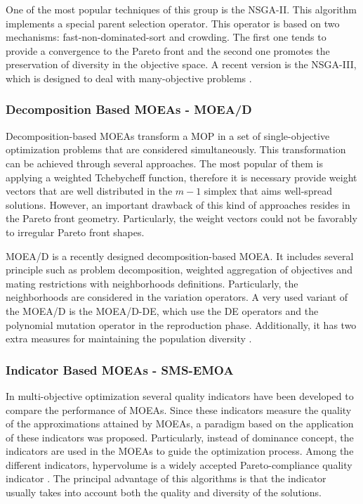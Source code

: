 %
One of the most popular techniques of this group is the NSGA-II.
%
This algorithm \cite{Joel:NSGAII} implements a special parent selection operator.
%
This operator is based on two mechanisms: fast-non-dominated-sort and crowding.
%
The first one tends to provide a convergence to the Pareto front and the second one promotes the preservation of diversity in the objective space.
%
A recent version is the NSGA-III, which is designed to deal with many-objective problems \cite{Joel:NSGAIII}.%
%

\subsubsection{Decomposition Based MOEAs - MOEA/D}

Decomposition-based MOEAs \cite{Joel:MOEAD} transform a MOP in a set of single-objective optimization problems that are considered simultaneously.
%
This transformation can be achieved through several approaches.
%
The most popular of them is applying a weighted Tchebycheff function, therefore it is necessary provide weight vectors that are well distributed in the $m-1$ simplex that aims well-spread solutions.
%
However, an important drawback of this kind of approaches resides in the Pareto front geometry.
%
Particularly, the weight vectors could not be favorably to irregular Pareto front shapes.
%

MOEA/D \cite{Joel:MOEAD} is a recently designed decomposition-based MOEA.
%
It includes several principle such as problem decomposition, weighted aggregation of objectives and mating restrictions with neighborhoods definitions.
%
Particularly, the neighborhoods are considered in the variation operators.
%
A very used variant of the MOEA/D is the MOEA/D-DE, which use the DE operators \cite{price2006differential} and the polynomial mutation operator \cite{hamdan2012distribution} in the reproduction phase.
%
Additionally, it has two extra measures for maintaining the population diversity \cite{zhang2009performance}.
%


\subsubsection{Indicator Based MOEAs - SMS-EMOA}

In multi-objective optimization several quality indicators have been developed to compare the performance of MOEAs.
%
Since these indicators measure the quality of the approximations attained by MOEAs, a paradigm based on the application of these indicators was proposed.
%
Particularly, instead of dominance concept, the indicators are used in the MOEAs to guide the optimization process.
%
Among the different indicators, hypervolume is a widely accepted Pareto-compliance quality indicator \cite{Joel:IGDPlus_And_GDPlus}.
%
The principal advantage of this algorithms is that the indicator usually takes into account both the quality and diversity of the solutions.
%

